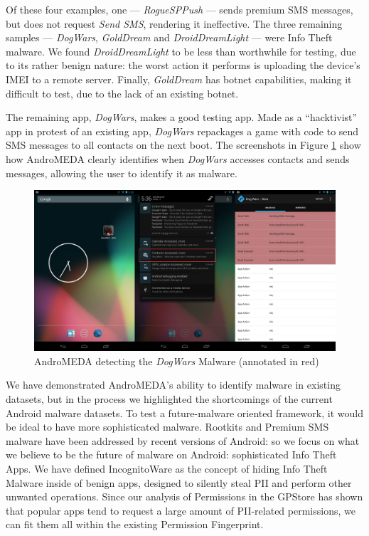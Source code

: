 \documentclass{acm_proc_article-sp}
\begin{document}
Of these four examples, one --- \textit{RogueSPPush} --- sends premium SMS messages, but does not request \textit{Send SMS}, rendering it ineffective. The three remaining samples --- \textit{DogWars}, \textit{GoldDream} and \textit{DroidDreamLight} --- were Info Theft malware. We found \textit{DroidDreamLight} to be less than worthwhile for testing, due to its rather benign nature: the worst action it performs is uploading the device's IMEI to a remote server. Finally, \textit{GoldDream} has botnet capabilities, making it difficult to test, due to the lack of an existing botnet.

The remaining app, \textit{DogWars}, makes a good testing app. Made as a ``hacktivist'' app in protest of an existing app\citep{symantecdogwars}, \textit{DogWars} repackages a game with code to send SMS messages to all contacts on the next boot. The screenshots in Figure \ref{fig:dogwars_visual} show how AndroMEDA clearly identifies when \textit{DogWars} accesses contacts and sends messages, allowing the user to identify it as malware.

\begin{figure}[h]
\begin{center}
\includegraphics[width=1.0\columnwidth]{figs/dogwars_detection}
\caption{AndroMEDA detecting the \textit{DogWars} Malware (annotated in red) }
\label{fig:dogwars_visual}
\end{center}
\end{figure}

We have demonstrated AndroMEDA's ability to identify malware in existing datasets, but in the process we highlighted the shortcomings of the current Android malware datasets. To test a future-malware oriented framework, it would be ideal to have more sophisticated malware. Rootkits and Premium SMS malware have been addressed by recent versions of Android: so we focus on what we believe to be the future of malware on Android: sophisticated Info Theft Apps. We have defined IncognitoWare as the concept of hiding Info Theft Malware inside of benign apps, designed to silently steal PII and perform other unwanted operations. Since our analysis of Permissions in the GPStore has shown that popular apps tend to request a large amount of PII-related permissions, we can fit them all within the existing Permission Fingerprint. 
\end{document}
